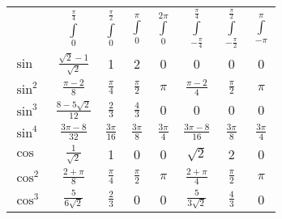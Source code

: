 \renewcommand{\arraystretch}{1.5}
\setlength\tabcolsep{10pt} %
\begin{tabularx}{\linewidth}{@{}lccccccc@{}}
                        & $\int\limits_0^{\frac{\pi}{4}} $ & $\int\limits_0^{\frac{\pi}{2}}$ & $\int\limits_0^{\pi}$ & $\int\limits_0^{2\pi}$ & $\int\limits_{-\frac{\pi}{4}}^{\frac{\pi}{4}} $ & $\int\limits_{-\frac{\pi}{2}}^{\frac{\pi}{2}} $ & $\int\limits_{-\pi}^{\pi}$ \\ 
    \cmidrule{2-7}
    $\sin$              & $\frac{\sqrt{2}-1}{\sqrt{2}}$    & 1                               & 2                     & 0                      & 0                                               & 0                                               & 0                          \\ 
    $\sin^2$            & $\frac{\pi-2}{8}$                & $\frac{\pi}{4}$                 & $\frac{\pi}{2}$       & $\pi$                  & $\frac{\pi-2}{4}$                               & $\frac{\pi}{2}$                                 & $\pi$                      \\
    $\sin^3$            & $\frac{8-5\sqrt{2}}{12}$         & $\frac{2}{3}$                   & $\frac{4}{3}$         & 0                      & 0                                               & 0                                               & 0                          \\
    $\sin^4$            & $\frac{3\pi-8}{32}$              & $\frac{3\pi}{16}$               & $\frac{3\pi}{8}$      & $\frac{3\pi}{4}$       & $\frac{3\pi-8}{16}$                             & $\frac{3\pi}{8}$                                & $\frac{3\pi}{4}$           \\
    $\cos$              & $ \frac{1}{\sqrt{2}}$            & 1                               & 0                     & 0                      & $\sqrt{2}$                                      & 2                                               & 0                          \\
    $\cos^2$            & $\frac{2+\pi}{8}$                & $\frac{\pi}{4}$                 & $\frac{\pi}{2}$       & $\pi$                  & $\frac{2+\pi}{4}$                               & $\frac{\pi}{2}$                                 & $\pi$                      \\
    $\cos^3$            & $\frac{5}{6\sqrt{2}}$            & $\frac{2}{3}$                   & 0                     & 0                      & $\frac{5}{3\sqrt{2}}$                           & $\frac{4}{3}$                                   & 0                          \\

\end{tabularx}
